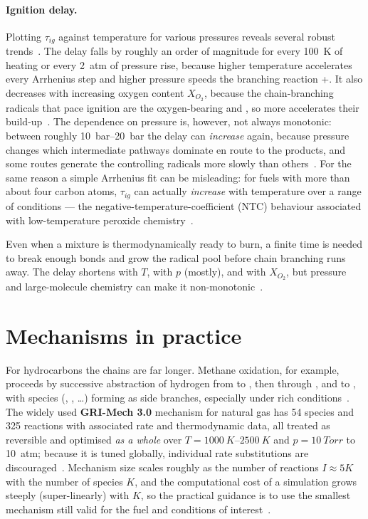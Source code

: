 \paragraph{Ignition delay.} Plotting $\tau_{ig}$ against temperature for various pressures reveals several robust trends~\cite{lecture3,transcript_tutorial}. The delay falls by roughly an order of magnitude for every \SI{100}{K} of heating or every \SI{2}{atm} of pressure rise, because higher temperature accelerates every Arrhenius step and higher pressure speeds the branching reaction +. It also decreases with increasing oxygen content $X_{O_2}$, because the chain-branching radicals that pace ignition are the oxygen-bearing  and , so more  accelerates their build-up~\cite{lecture3,transcript_tutorial}. The dependence on pressure is, however, not always monotonic: between roughly \SIrange{10}{20}{bar} the delay can \emph{increase} again, because pressure changes which intermediate pathways dominate en route to the products, and some routes generate the controlling radicals more slowly than others~\cite{transcript_tutorial}. For the same reason a simple Arrhenius fit can be misleading: for fuels with more than about four carbon atoms, $\tau_{ig}$ can actually \emph{increase} with temperature over a range of conditions --- the negative-temperature-coefficient (NTC) behaviour associated with low-temperature peroxide chemistry~\cite{lecture3}.

\begin{keybox}
Even when a mixture is thermodynamically ready to burn, a finite time is needed to break enough bonds and grow the radical pool before chain branching runs away. The delay shortens with $T$, with $p$ (mostly), and with $X_{O_2}$, but pressure and large-molecule chemistry can make it non-monotonic~\cite{lecture3,transcript_tutorial}.
\end{keybox}

\section{Mechanisms in practice}

For hydrocarbons the chains are far longer. Methane oxidation, for example, proceeds by successive abstraction of hydrogen from  to , then through ,  and  to , with  species (, , \dots) forming as side branches, especially under rich conditions~\cite{lecture3,warnatz2006combustion}. The widely used \textbf{GRI-Mech 3.0} mechanism for natural gas has 54 species and 325 reactions with associated rate and thermodynamic data, all treated as reversible and optimised \emph{as a whole} over $T=\SIrange{1000}{2500}{K}$ and $p=\SI{10}{Torr}$ to \SI{10}{atm}; because it is tuned globally, individual rate substitutions are discouraged~\cite{lecture3}. Mechanism size scales roughly as the number of reactions $I\approx5K$ with the number of species $K$, and the computational cost of a simulation grows steeply (super-linearly) with $K$, so the practical guidance is to use the smallest mechanism still valid for the fuel and conditions of interest~\cite{lecture3,transcript_tutorial}.

